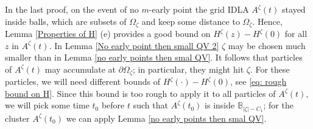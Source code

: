 \documentclass[11pt]{article}
\numberwithin{equation}{section}
\def\OZ{\Omega_{\zeta}}
\def\mydot{\boldsymbol{\cdot}}
\begin{document}
In the last proof, on the event of no $m$-early point the grid IDLA $A^{\zeta}(t)$ 
stayed inside balls, which are subsets of $\OZ$ and keep some distance to $\OZ$. 
Hence, Lemma \ref{Properties of H} (e) provides a good bound on 
$H^{\zeta}(z)- H^{\zeta}(0)$ for all $z$ in $A^{\zeta}(t)$. 
In Lemma \ref{No early point then small QV 2} $\zeta$ may be chosen much smaller
than in Lemma \ref{no early points then smal QV}. 
It follows that particles of $A^{\zeta}(t)$ may accumulate at $\partial \OZ$; 
in particular, they might hit $\zeta$.
For these particles, we will need different bounds of $H^{\zeta}(\mydot) - H^{\zeta}(0)$, 
see \eqref{eq: rough bound on H}. 
Since this bound is too rough to apply it to all particles of $A^{\zeta}(t)$, 
we will pick some time $t_0$ before $t$ such that $A^{\zeta}(t_0)$ is inside 
$\mathbb{B}_{|\zeta|-C_1}$; for the cluster $A^{\zeta}(t_0)$ we can apply 
Lemma \ref{no early points then smal QV}.
\end{document}
